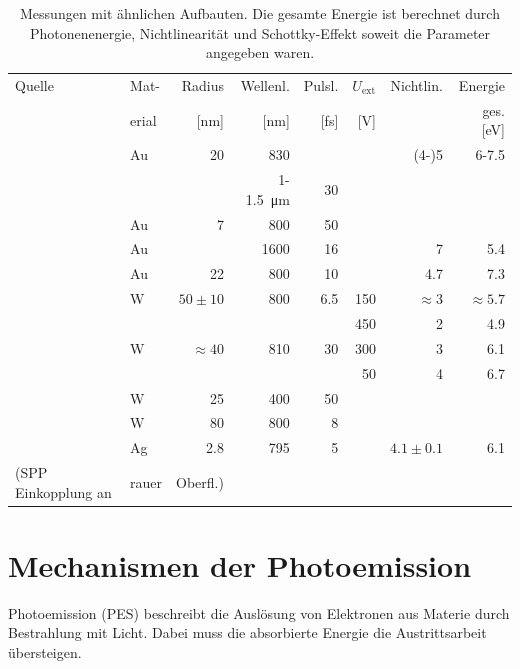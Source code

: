 \documentclass[bachelor,       %
               twoside,        %
               BCOR10mm,       %
               english,ngerman, %
               final,          %
               ]{GAUBM}
\begin{document}
\begin{table}[h]
	\centering
	\begin{tabular}{|l|l|r|r|r|r|r||r|}
\hline	Quelle 	& Mat- & Radius & Wellenl. & Pulsl. & $U_\text{ext}$ & Nichtlin. & Energie\\
& erial & [nm] & [nm] & [fs] & [V] & & ges. [eV]\\\hline\hline

	\cite{bormann_2010} & Au   & 20		 & 830 			&	 & 	& (4-)5 & 6-7.5 \\\hline
	\cite{park_2012} & & & 1-\SI{1.5}{\micro\m} & 30 & & & \\\hline
	\cite{wimmer_2014} & Au & 7 & 800 & 50 & & & \\\hline
	\cite{vogelsang_2015} & Au & & 1600 & 16 & & 7 & 5.4\\\hline
	\cite{benni_15} & Au & 22 & 800 & 10 & & 4.7 & 7.3\\\hline
	\cite{schenk_2010} & W & $50\pm10$ & 800 & 6.5 & 150 & $\approx 3$ & $\approx 5.7$\\\hline
				& & & & & 450 & 2 & 4.9\\
	\cite{barwick_2007} & W & $\approx 40$ & 810 & 30 & 300 & 3 & 6.1 \\
				& & & & & 50 & 4 & 6.7\\\hline
	\cite{bormann_ea_2015} & W & 25 & 400 & 50 & & & \\\hline
	\cite{hommelhoff_2006} & W & 80 & 800 & 8 & & & \\\hline
	\cite{dombi_2010} & Ag & 2.8 & 795 & 5 & & $4.1\pm 0.1$ & 6.1\\
	(SPP Einkopplung an & rauer & Oberfl.) & & & & &\\\hline
	\end{tabular}
	\caption{Messungen mit ähnlichen Aufbauten. Die gesamte Energie ist berechnet durch Photonenenergie, Nichtlinearität und Schottky-Effekt soweit die Parameter angegeben waren.}
	\label{tab:tip_andere_gruppen}
\end{table}



\section{Mechanismen der Photoemission}
Photoemission (PES) beschreibt die Auslösung von Elektronen aus Materie durch Bestrahlung mit Licht.
Dabei muss die absorbierte Energie die Austrittsarbeit übersteigen.
\end{document}
